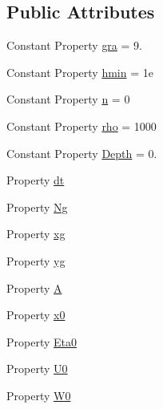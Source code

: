 \subsection*{Public Attributes}
\begin{DoxyCompactItemize}
\item 
Constant Property \hyperlink{class_nonhydrostatic_solitary_wave_run_up_wall_a51834c559bcffc5dbefefdee55f4a198}{gra} = 9.
\item 
Constant Property \hyperlink{class_nonhydrostatic_solitary_wave_run_up_wall_a9fcf30023458410353386b2c294ef5e1}{hmin} = 1e
\item 
Constant Property \hyperlink{class_nonhydrostatic_solitary_wave_run_up_wall_ad8333e677293318b32683b00ac9a9a4f}{n} = 0
\item 
Constant Property \hyperlink{class_nonhydrostatic_solitary_wave_run_up_wall_a2a1afa9068e2a5da02d328896e70e68b}{rho} = 1000
\item 
Constant Property \hyperlink{class_nonhydrostatic_solitary_wave_run_up_wall_a28331959e4281dd1538eecaa8a697329}{Depth} = 0.
\item 
Property \hyperlink{class_nonhydrostatic_solitary_wave_run_up_wall_a98c4d52cd03adbeb0dcec3808a976961}{dt}
\item 
Property \hyperlink{class_nonhydrostatic_solitary_wave_run_up_wall_a0d00a60e786ffdbc6f774b99eac8addb}{Ng}
\item 
Property \hyperlink{class_nonhydrostatic_solitary_wave_run_up_wall_a2dfc6e53104c3d51cafdbf5d574800c6}{xg}
\item 
Property \hyperlink{class_nonhydrostatic_solitary_wave_run_up_wall_a86a5d4259833f04b6ebcb1f232868e18}{yg}
\item 
Property \hyperlink{class_nonhydrostatic_solitary_wave_run_up_wall_a89228fd4bf541d62b960453f8d0018aa}{A}
\item 
Property \hyperlink{class_nonhydrostatic_solitary_wave_run_up_wall_aec3ca8740a502d80370a0a01adf52938}{x0}
\item 
Property \hyperlink{class_nonhydrostatic_solitary_wave_run_up_wall_afca2248dd1d1c8dc1fdb6b42ec49c67c}{Eta0}
\item 
Property \hyperlink{class_nonhydrostatic_solitary_wave_run_up_wall_a8768616258ba51cfb2baaacb59499f36}{U0}
\item 
Property \hyperlink{class_nonhydrostatic_solitary_wave_run_up_wall_a4da35dd58284f0421531cd7ed6289459}{W0}
\end{DoxyCompactItemize}
